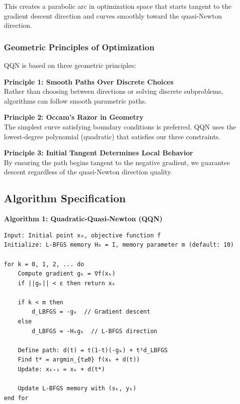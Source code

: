 This creates a parabolic arc in optimization space that starts tangent to the gradient descent direction and curves smoothly toward the quasi-Newton direction.

\hypertarget{geometric-principles-of-optimization}{%
\subsubsection{Geometric Principles of Optimization}\label{geometric-principles-of-optimization}}

QQN is based on three geometric principles:

\textbf{Principle 1: Smooth Paths Over Discrete Choices}\\
Rather than choosing between directions or solving discrete subproblems, algorithms can follow smooth parametric paths.

\textbf{Principle 2: Occam's Razor in Geometry}\\
The simplest curve satisfying boundary conditions is preferred. QQN uses the lowest-degree polynomial (quadratic) that satisfies our three constraints.

\textbf{Principle 3: Initial Tangent Determines Local Behavior}\\
By ensuring the path begins tangent to the negative gradient, we guarantee descent regardless of the quasi-Newton direction quality.

\hypertarget{algorithm-specification}{%
\subsection{Algorithm Specification}\label{algorithm-specification}}

\textbf{Algorithm 1: Quadratic-Quasi-Newton (QQN)}

\begin{verbatim}
Input: Initial point x₀, objective function f
Initialize: L-BFGS memory H₀ = I, memory parameter m (default: 10)

for k = 0, 1, 2, ... do
    Compute gradient gₖ = ∇f(xₖ)
    if ||gₖ|| < ε then return xₖ

    if k < m then
        d_LBFGS = -gₖ  // Gradient descent
    else
        d_LBFGS = -Hₖgₖ  // L-BFGS direction

    Define path: d(t) = t(1-t)(-gₖ) + t²d_LBFGS
    Find t* = argmin_{t≥0} f(xₖ + d(t))
    Update: xₖ₊₁ = xₖ + d(t*)

    Update L-BFGS memory with (sₖ, yₖ)
end for
\end{verbatim}

